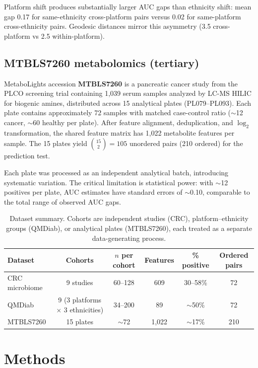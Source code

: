 \documentclass{article}
\begin{document}
Platform shift produces substantially larger AUC gaps than ethnicity shift: mean gap 0.17 for same-ethnicity cross-platform pairs versus 0.02 for same-platform cross-ethnicity pairs. Geodesic distances mirror this asymmetry (3.5 cross-platform vs 2.5 within-platform).

\subsection{MTBLS7260 metabolomics (tertiary)}
\label{sec:metab_data}

MetaboLights accession \textbf{MTBLS7260} \citep{leonletelier2024contributions} is a pancreatic cancer study from the PLCO screening trial containing 1{,}039 serum samples analyzed by LC-MS HILIC for biogenic amines, distributed across 15 analytical plates (PL079--PL093). Each plate contains approximately 72 samples with matched case-control ratio ($\sim$12 cancer, $\sim$60 healthy per plate). After feature alignment, deduplication, and $\log_2$ transformation, the shared feature matrix has 1{,}022 metabolite features per sample. The 15 plates yield $\binom{15}{2} = 105$ unordered pairs (210 ordered) for the prediction test.

Each plate was processed as an independent analytical batch, introducing systematic variation. The critical limitation is statistical power: with $\sim$12 positives per plate, AUC estimates have standard errors of $\sim$0.10, comparable to the total range of observed AUC gaps.

\begin{table}[t]
\centering
\caption{Dataset summary. Cohorts are independent studies (CRC), platform--ethnicity groups (QMDiab), or analytical plates (MTBLS7260), each treated as a separate data-generating process.}
\label{tab:cohorts}
\begin{tabular}{lccccc}
\toprule
Dataset & Cohorts & $n$ per cohort & Features & \% positive & Ordered pairs \\
\midrule
CRC microbiome & 9 studies & 60--128 & 609 & 30--58\% & 72 \\
QMDiab & 9 (3 platforms $\times$ 3 ethnicities) & 34--200 & 89 & $\sim$50\% & 72 \\
MTBLS7260 & 15 plates & $\sim$72 & 1{,}022 & $\sim$17\% & 210 \\
\bottomrule
\end{tabular}
\end{table}


\section{Methods}
\label{sec:methods}
\end{document}
